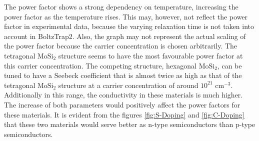 \documentclass[12pt]{article}
\theoremstyle{plain}
\theoremstyle{definition}
\newcommand{\<}{\langle}
\renewcommand{\>}{\rangle}
\begin{document}
The power factor shows a strong dependency on temperature, increasing the power factor as the temperature rises. This may, however, not reflect the power factor in experimental data, because the varying relaxation time is not taken into account in BoltzTrap2. 
Also, the graph may not represent the actual scaling of the power factor because the carrier concentration is chosen arbitrarily. 
The tetragonal $\text{Mo}\text{Si}_{2}$ structure seems to have the most favourable power factor at this carrier concentration. The competing structure, hexagonal $\text{MoSi}_{2}$, can be tuned to have a Seebeck coefficient that is almost twice as high as that of the tetragonal $\text{Mo}\text{Si}_{2}$ structure at a carrier concentration of around $10^{21}$ $\text{cm}^{-3}$. Additionally in this range, the conductivity in these materials is much higher. The increase of both parameters would positively affect the power factors for these materials. It is evident from the figures \ref{fig:S-Doping} and \ref{fig:C-Doping} that these two materials would serve better as n-type semiconductors than p-type semiconductors.
\end{document}
